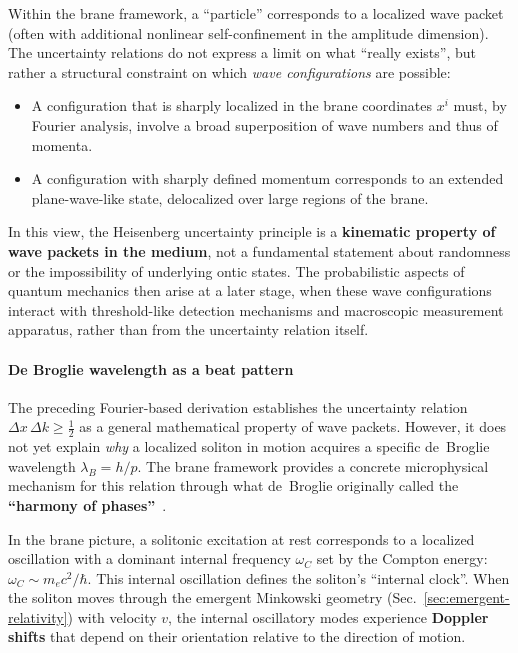 Within the brane framework, a ``particle'' corresponds to a localized
wave packet (often with additional nonlinear self-confinement in the
amplitude dimension). The uncertainty relations do not express a limit
on what ``really exists'', but rather a structural constraint on which
\emph{wave configurations} are possible:

\begin{itemize}
\tightlist
\item
  A configuration that is sharply localized in the brane coordinates
  $x^i$ must, by Fourier analysis, involve a broad superposition of wave
  numbers and thus of momenta.
\item
  A configuration with sharply defined momentum corresponds to an
  extended plane-wave-like state, delocalized over large regions of the
  brane.
\end{itemize}

In this view, the Heisenberg uncertainty principle is a
\textbf{kinematic property of wave packets in the medium}, not a
fundamental statement about randomness or the impossibility of
underlying ontic states. The probabilistic aspects of quantum mechanics
then arise at a later stage, when these wave configurations interact
with threshold-like detection mechanisms and macroscopic measurement
apparatus, rather than from the uncertainty relation itself.

\paragraph{De Broglie wavelength as a beat pattern}\label{de-broglie-beat-pattern}

The preceding Fourier-based derivation establishes the uncertainty
relation $\Delta x\,\Delta k \geq \tfrac{1}{2}$ as a general mathematical
property of wave packets. However, it does not yet explain \emph{why}
a localized soliton in motion acquires a specific de~Broglie wavelength
$\lambda_B = h/p$. The brane framework provides a concrete microphysical
mechanism for this relation through what de~Broglie originally called the
\textbf{``harmony of phases''}~\cite{deBroglie1924}.

In the brane picture, a solitonic excitation at rest corresponds to a
localized oscillation with a dominant internal frequency $\omega_C$ set by
the Compton energy: $\omega_C \sim m_e c^2/\hbar$. This internal
oscillation defines the soliton's ``internal clock''. When the soliton
moves through the emergent Minkowski geometry (Sec.~\ref{sec:emergent-relativity})
with velocity $v$, the internal oscillatory modes experience
\textbf{Doppler shifts} that depend on their orientation relative to the
direction of motion.\cite{Williamson1997,HuygensOptics2025}

